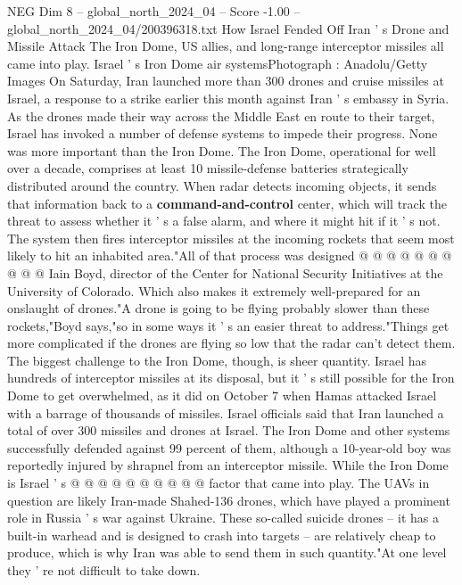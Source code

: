 \begin{textsample}{NEG Dim 8 – global\_north\_2024\_04 – Score -1.00 – global\_north\_2024\_04/200396318.txt}  \label{ex:f8_neg_136}
How Israel Fended Off Iran ' s Drone and Missile Attack The Iron Dome, US allies, and long-range interceptor missiles all came into play.
Israel ' s Iron Dome air systemsPhotograph : Anadolu/Getty Images On Saturday, Iran launched more than 300 drones and cruise missiles at Israel, a response to a strike earlier this month against Iran ' s embassy in Syria.
As the drones made their way across the Middle East en route to their target, Israel has invoked a number of defense systems to impede their progress.
None was more important than the Iron Dome.
The Iron Dome, operational for well over a decade, comprises at least 10 missile-defense batteries strategically distributed around the country.
When radar detects incoming objects, it sends that information back to a \textbf{command-and-control} center, which will track the threat to assess whether it ' s a false alarm, and where it might hit if it ' s not.
The system then fires interceptor missiles at the incoming rockets that seem most likely to hit an inhabited area."All of that process was designed @ @ @ @ @ @ @ @ @ @ Iain Boyd, director of the Center for National Security Initiatives at the University of Colorado.
Which also makes it extremely well-prepared for an onslaught of drones."A drone is going to be flying probably slower than these rockets,"Boyd says,"so in some ways it ' s an easier threat to address."Things get more complicated if the drones are flying so low that the radar can't detect them.
The biggest challenge to the Iron Dome, though, is sheer quantity.
Israel has hundreds of interceptor missiles at its disposal, but it ' s still possible for the Iron Dome to get overwhelmed, as it did on October 7 when Hamas attacked Israel with a barrage of thousands of missiles.
Israel officials said that Iran launched a total of over 300 missiles and drones at Israel.
The Iron Dome and other systems successfully defended against 99 percent of them, although a 10-year-old boy was reportedly injured by shrapnel from an interceptor missile.
While the Iron Dome is Israel ' s @ @ @ @ @ @ @ @ @ @ factor that came into play.
The UAVs in question are likely Iran-made Shahed-136 drones, which have played a prominent role in Russia ' s war against Ukraine.
These so-called suicide drones -- it has a built-in warhead and is designed to crash into targets -- are relatively cheap to produce, which is why Iran was able to send them in such quantity."At one level they ' re not difficult to take down.

\end{textsample}
